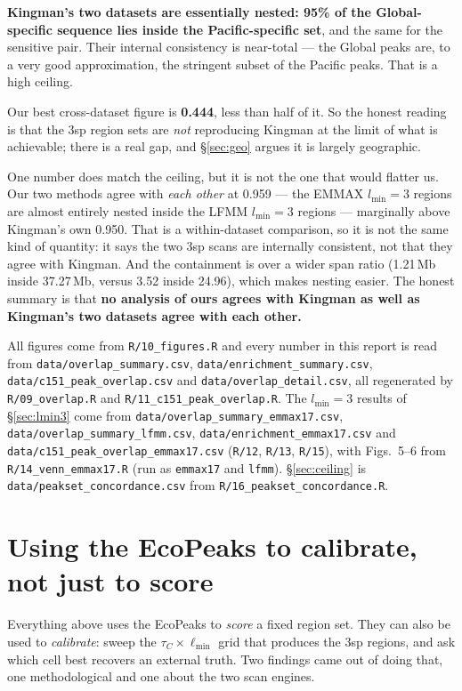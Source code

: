 \documentclass[11pt,a4paper]{article}
\begin{document}
\textbf{Kingman's two datasets are essentially nested: 95\% of the Global-specific sequence
lies inside the Pacific-specific set}, and the same for the sensitive pair. Their internal
consistency is near-total --- the Global peaks are, to a very good approximation, the
stringent subset of the Pacific peaks. That is a high ceiling.

Our best cross-dataset figure is \textbf{0.444}, less than half of it. So the honest reading
is that the 3sp region sets are \emph{not} reproducing Kingman at the limit of what is
achievable; there is a real gap, and \S\ref{sec:geo} argues it is largely geographic.

One number does match the ceiling, but it is not the one that would flatter us. Our two
methods agree with \emph{each other} at 0.959 --- the EMMAX $l_{\min}{=}3$ regions are
almost entirely nested inside the LFMM $l_{\min}{=}3$ regions --- marginally above Kingman's
own 0.950. That is a within-dataset comparison, so it is not the same kind of quantity: it
says the two 3sp scans are internally consistent, not that they agree with Kingman. And the
containment is over a wider span ratio (1.21\,Mb inside 37.27\,Mb, versus 3.52 inside
24.96), which makes nesting easier. The honest summary is that \textbf{no analysis of ours
agrees with Kingman as well as Kingman's two datasets agree with each other.}

All figures come from \texttt{R/10\_figures.R} and every number in this report is read from \texttt{data/overlap\_summary.csv}, \texttt{data/enrichment\_summary.csv}, \texttt{data/c151\_peak\_overlap.csv} and \texttt{data/overlap\_detail.csv}, all regenerated by \texttt{R/09\_overlap.R} and \texttt{R/11\_c151\_peak\_overlap.R}. The
$l_{\min}{=}3$ results of \S\ref{sec:lmin3} come from \texttt{data/overlap\_summary\_emmax17.csv},
\texttt{data/overlap\_summary\_lfmm.csv}, \texttt{data/enrichment\_emmax17.csv} and
\texttt{data/c151\_peak\_overlap\_emmax17.csv} (\texttt{R/12}, \texttt{R/13}, \texttt{R/15}),
with Figs.~5--6 from \texttt{R/14\_venn\_emmax17.R} (run as \texttt{emmax17} and \texttt{lfmm}).
\S\ref{sec:ceiling} is \texttt{data/peakset\_concordance.csv} from \texttt{R/16\_peakset\_concordance.R}.

\section{Using the EcoPeaks to calibrate, not just to score}\label{sec:calib}

Everything above uses the EcoPeaks to \emph{score} a fixed region set. They can also be
used to \emph{calibrate}: sweep the $\tau_C \times \ell_{\min}$ grid that produces the
3sp regions, and ask which cell best recovers an external truth. Two findings came out of
doing that, one methodological and one about the two scan engines.
\end{document}
